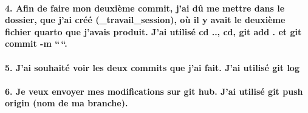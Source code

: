 \documentclass[
  letterpaper,
  DIV=11,
  numbers=noendperiod]{scrartcl}
\let\oldparagraph\paragraph
\renewcommand{\paragraph}[1]{\oldparagraph{#1}\mbox{}}
\begin{document}
\paragraph{4. Afin de faire mon deuxième commit, j'ai dû me mettre dans
le dossier, que j'ai créé (\_travail\_session), où il y avait le
deuxième fichier quarto que j'avais produit. J'ai utilisé cd .., cd, git
add . et git commit -m
``\,``.}\label{afin-de-faire-mon-deuxiuxe8me-commit-jai-duxfb-me-mettre-dans-le-dossier-que-jai-cruxe9uxe9-_travail_session-ouxf9-il-y-avait-le-deuxiuxe8me-fichier-quarto-que-javais-produit.-jai-utilisuxe9-cd-..-cd-git-add-.-et-git-commit--m-.}

\paragraph{5. J'ai souhaité voir les deux commits que j'ai fait. J'ai
utilisé git
log}\label{jai-souhaituxe9-voir-les-deux-commits-que-jai-fait.-jai-utilisuxe9-git-log}

\paragraph{6. Je veux envoyer mes modifications sur git hub. J'ai
utilisé git push origin (nom de ma
branche).}\label{je-veux-envoyer-mes-modifications-sur-git-hub.-jai-utilisuxe9-git-push-origin-nom-de-ma-branche.}
\end{document}
